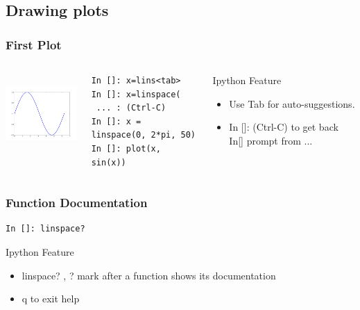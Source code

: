 \documentclass[14pt,compress]{beamer}
\begin{document}
\subsection{Drawing plots}
\begin{frame}[fragile]
\frametitle{First Plot}
\begin{columns}
    \hspace*{-0.12in}
  \includegraphics[height=1.2in, interpolate=true]{data/firstplot}
    \begin{block}{}
    \begin{small}
\begin{lstlisting}
In []: x=lins<tab>
In []: x=linspace(
 ... : (Ctrl-C)
In []: x = linspace(0, 2*pi, 50)
In []: plot(x, sin(x))
\end{lstlisting}
    \end{small}
    \end{block}
 \begin{block}{Ipython Feature}
    \begin{itemize}
      \item Use Tab for auto-suggestions.
      \item In []: (Ctrl-C) to get back In[] prompt from ...
  \end{itemize}
  \end{block}
\end{columns}
\end{frame}


\begin{frame}[fragile]
\frametitle{Function Documentation}
\begin {block}{}
\begin{lstlisting}
In []: linspace?
\end{lstlisting}
\end{block}
\begin{block}{Ipython Feature}
    \begin{itemize}
      \item linspace? , ? mark after a function shows its documentation
      \item q to exit help  
  \end{itemize}
  \end{block}
\end{frame}
\end{document}
